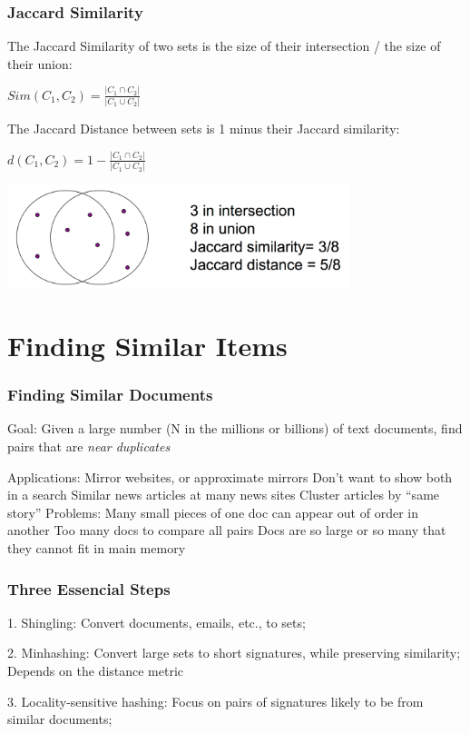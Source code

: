 \documentclass[svgnames]{beamer}
\begin{document}
\begin{frame} \frametitle{Jaccard Similarity}

The Jaccard Similarity of two sets is the size of their intersection / the size of their union:

$Sim(C_1, C_2) = \frac{|C_1 \cap C_2|}{|C_1 \cup C_2|}$

The Jaccard Distance between sets is 1 minus their Jaccard similarity:

$d(C_1, C_2) = 1 - \frac{|C_1 \cap C_2|}{|C_1 \cup C_2|}$


\includegraphics[width=10cm]{jaccard}

\end{frame}

  
\section{Finding Similar Items}

  
\begin{frame} \frametitle{Finding Similar Documents}

Goal: Given a large number (N in the millions or billions) of text documents, find pairs that are \emph{near duplicates}

Applications:
  Mirror websites, or approximate mirrors
    Don’t want to show both in a search
  Similar news articles at many news sites
    Cluster articles by “same story”
Problems:
  Many small pieces of one doc can appear out of order in another
  Too many docs to compare all pairs
  Docs are so large or so many that they cannot fit in main memory

\end{frame}

  
\begin{frame} \frametitle{Three Essencial Steps}

1. Shingling: Convert documents, emails, etc., to sets;

2. Minhashing: Convert large sets to short signatures, while preserving similarity;
   Depends on the distance metric

3. Locality-sensitive hashing: Focus on pairs of signatures likely to be from similar documents;

\end{frame}
\end{document}
